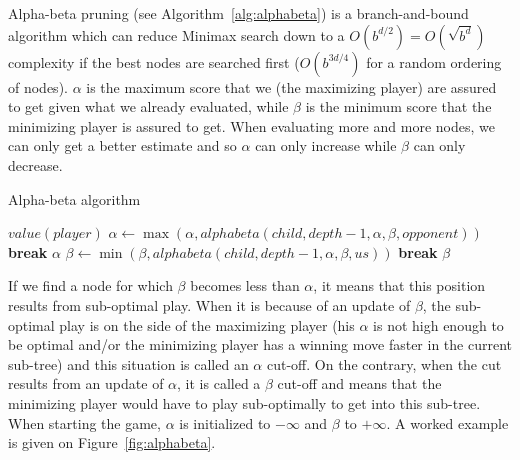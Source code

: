 Alpha-beta pruning (see Algorithm~\ref{alg:alphabeta}) is a branch-and-bound algorithm which can reduce Minimax search down to a $O(b^{d/2})=O(\sqrt{b^d})$ complexity if the best nodes are searched first ($O(b^{3d/4})$ for a random ordering of nodes). $\alpha$ is the maximum score that we (the maximizing player) are assured to get given what we already evaluated, while $\beta$ is the minimum score that the minimizing player is assured to get. When evaluating more and more nodes, we can only get a better estimate and so $\alpha$ can only increase while $\beta$ can only decrease. %
\begin{algorithm}
\caption{Alpha-beta algorithm}
\label{alg:alphabeta}
\begin{algorithmic}
        \State \Return $value(player)$
    \EndIf
            \State $\alpha \gets \max{(\alpha, alphabeta(child,depth-1,\alpha,\beta,opponent))}$
            \If{$\beta \leq \alpha$}
                \State \textbf{break}
            \EndIf
        \EndFor
        \State \Return $\alpha$
    \Else
            \State $\beta \gets \min{(\beta, alphabeta(child,depth-1,\alpha,\beta,us))}$
            \If{$\beta \leq \alpha$}
                \State \textbf{break}
            \EndIf
        \EndFor
        \State \Return $\beta$
    \EndIf
\EndFunction
\end{algorithmic}
\end{algorithm}
If we find a node for which $\beta$ becomes less than $\alpha$, it means that this position results from sub-optimal play. When it is because of an update of $\beta$, the sub-optimal play is on the side of the maximizing player (his $\alpha$ is not high enough to be optimal and/or the minimizing player has a winning move faster in the current sub-tree) and this situation is called an $\alpha$ cut-off. On the contrary, when the cut results from an update of $\alpha$, it is called a $\beta$ cut-off and means that the minimizing player would have to play sub-optimally to get into this sub-tree. When starting the game, $\alpha$ is initialized to $-\infty$ and $\beta$ to $+\infty$. A worked example is given on Figure~\ref{fig:alphabeta}.
